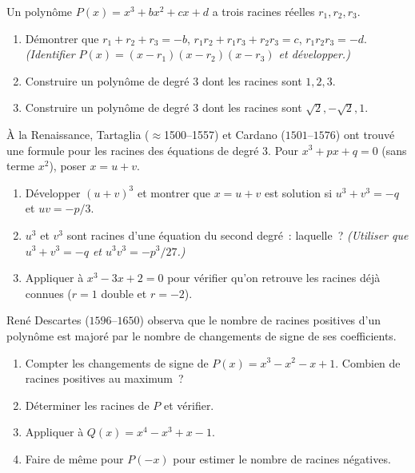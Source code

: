 \begin{challenge}
Un polyn\^ome $P(x) = x^3 + bx^2 + cx + d$ a trois racines r\'eelles $r_1, r_2, r_3$.
\begin{enumerate}
  \item D\'emontrer que $r_1+r_2+r_3 = -b$,\;
        $r_1r_2+r_1r_3+r_2r_3 = c$,\; $r_1r_2r_3 = -d$.
        \emph{(Identifier $P(x) = (x-r_1)(x-r_2)(x-r_3)$ et d\'evelopper.)}
  \item Construire un polyn\^ome de degr\'e $3$ dont les racines sont $1, 2, 3$.
  \item Construire un polyn\^ome de degr\'e $3$ dont les racines sont
        $\sqrt{2}, -\sqrt{2}, 1$.
\end{enumerate}
\end{challenge}

\begin{challenge}
\`A la Renaissance, Tartaglia ($\approx$1500--1557) et Cardano
($1501$--$1576$) ont trouv\'e une formule pour les racines des
\'equations de degr\'e 3.
Pour $x^3 + px + q = 0$ (sans terme $x^2$), poser $x = u + v$.
\begin{enumerate}
  \item D\'evelopper $(u+v)^3$ et montrer que $x = u+v$ est solution si
        $u^3 + v^3 = -q$ et $uv = -p/3$.
  \item $u^3$ et $v^3$ sont racines d'une \'equation du second degr\'e~:
        laquelle~? \emph{(Utiliser que $u^3+v^3=-q$ et $u^3 v^3 = -p^3/27$.)}
  \item Appliquer \`a $x^3 - 3x + 2 = 0$ pour v\'erifier qu'on retrouve
        les racines d\'ej\`a connues ($r=1$ double et $r=-2$).
\end{enumerate}
\end{challenge}

\begin{challenge}
Ren\'e Descartes ($1596$--$1650$) observa que le nombre de racines positives
d'un polyn\^ome est major\'e par le nombre de changements de signe de ses coefficients.
\begin{enumerate}
  \item Compter les changements de signe de $P(x) = x^3 - x^2 - x + 1$.
        Combien de racines positives au maximum~?
  \item D\'eterminer les racines de $P$ et v\'erifier.
  \item Appliquer \`a $Q(x) = x^4 - x^3 + x - 1$.
  \item Faire de m\^eme pour $P(-x)$ pour estimer le nombre de racines n\'egatives.
\end{enumerate}
\end{challenge}

